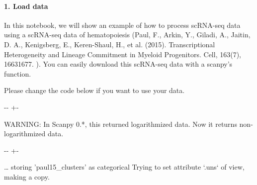 \documentclass[letterpaper,10pt,english]{sphinxmanual}
\newlength\nbsphinxcodecellspacing
\begin{document}
\paragraph{1. Load data}
\label{\detokenize{notebooks/03_scRNA-seq_data_preprocessing/scanpy_preprocessing_with_Paul_etal_2015_data:1.-Load-data}}
In this notebook, we will show an example of how to process scRNA-seq data using a scRNA-seq data of hematopoiesis (Paul, F., Arkin, Y., Giladi, A., Jaitin, D. A., Kenigsberg, E., Keren-Shaul, H., et al. (2015). Transcriptional Heterogeneity and Lineage Commitment in Myeloid Progenitors. Cell, 163(7), 1663\textendash{}1677. ). You can easily download this scRNA-seq data with a scanpy’s function.

Please change the code below if you want to use your data.

{
%
\begin{sphinxVerbatim}[commandchars=\\\{\}]
\llap{\color{nbsphinxin}[3]:\,\hspace{\fboxrule}\hspace{\fboxsep}}
  
\end{sphinxVerbatim}
}



%
{
\kern-\sphinxverbatimsmallskipamount\kern-\baselineskip
\kern+\FrameHeightAdjust\kern-\fboxrule
\vspace{\nbsphinxcodecellspacing}
%
\begin{sphinxVerbatim}[commandchars=\\\{\}]
WARNING: In Scanpy 0.*, this returned logarithmized data. Now it returns non-logarithmized data.
\end{sphinxVerbatim}
}
\relax



%
{
\kern-\sphinxverbatimsmallskipamount\kern-\baselineskip
\kern+\FrameHeightAdjust\kern-\fboxrule
\vspace{\nbsphinxcodecellspacing}
%
\begin{sphinxVerbatim}[commandchars=\\\{\}]
{\ldots} storing 'paul15\_clusters' as categorical
Trying to set attribute `.uns` of view, making a copy.
\end{sphinxVerbatim}
}
\relax
\end{document}
